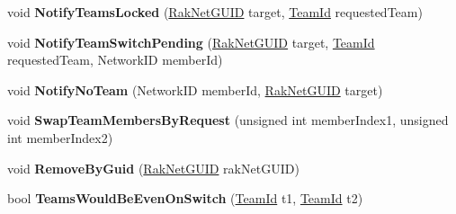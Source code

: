 \begin{DoxyCompactItemize}
\item 
\hypertarget{class_rak_net_1_1_team_balancer_a1932a197df039581fcffad2656f28f68}{void {\bfseries Notify\-Teams\-Locked} (\hyperlink{struct_rak_net_1_1_rak_net_g_u_i_d}{Rak\-Net\-G\-U\-I\-D} target, \hyperlink{group___t_e_a_m___b_a_l_a_n_c_e_r___g_r_o_u_p_ga79c7825649955f28135498fb3d9f6894}{Team\-Id} requested\-Team)}\label{class_rak_net_1_1_team_balancer_a1932a197df039581fcffad2656f28f68}

\item 
\hypertarget{class_rak_net_1_1_team_balancer_ab84282ec4b1eb634608cf8bd4db7377e}{void {\bfseries Notify\-Team\-Switch\-Pending} (\hyperlink{struct_rak_net_1_1_rak_net_g_u_i_d}{Rak\-Net\-G\-U\-I\-D} target, \hyperlink{group___t_e_a_m___b_a_l_a_n_c_e_r___g_r_o_u_p_ga79c7825649955f28135498fb3d9f6894}{Team\-Id} requested\-Team, Network\-I\-D member\-Id)}\label{class_rak_net_1_1_team_balancer_ab84282ec4b1eb634608cf8bd4db7377e}

\item 
\hypertarget{class_rak_net_1_1_team_balancer_a7f0340a70a5339df34b7acfb3b249384}{void {\bfseries Notify\-No\-Team} (Network\-I\-D member\-Id, \hyperlink{struct_rak_net_1_1_rak_net_g_u_i_d}{Rak\-Net\-G\-U\-I\-D} target)}\label{class_rak_net_1_1_team_balancer_a7f0340a70a5339df34b7acfb3b249384}

\item 
\hypertarget{class_rak_net_1_1_team_balancer_aea7759225257f66e83d0805296ec2e62}{void {\bfseries Swap\-Team\-Members\-By\-Request} (unsigned int member\-Index1, unsigned int member\-Index2)}\label{class_rak_net_1_1_team_balancer_aea7759225257f66e83d0805296ec2e62}

\item 
\hypertarget{class_rak_net_1_1_team_balancer_a7b3d5e05aaa882a94717652ea796b691}{void {\bfseries Remove\-By\-Guid} (\hyperlink{struct_rak_net_1_1_rak_net_g_u_i_d}{Rak\-Net\-G\-U\-I\-D} rak\-Net\-G\-U\-I\-D)}\label{class_rak_net_1_1_team_balancer_a7b3d5e05aaa882a94717652ea796b691}

\item 
\hypertarget{class_rak_net_1_1_team_balancer_a44ca5b9bb9042a6f79875ed71ae8c2fa}{bool {\bfseries Teams\-Would\-Be\-Even\-On\-Switch} (\hyperlink{group___t_e_a_m___b_a_l_a_n_c_e_r___g_r_o_u_p_ga79c7825649955f28135498fb3d9f6894}{Team\-Id} t1, \hyperlink{group___t_e_a_m___b_a_l_a_n_c_e_r___g_r_o_u_p_ga79c7825649955f28135498fb3d9f6894}{Team\-Id} t2)}\label{class_rak_net_1_1_team_balancer_a44ca5b9bb9042a6f79875ed71ae8c2fa}

\end{DoxyCompactItemize}
